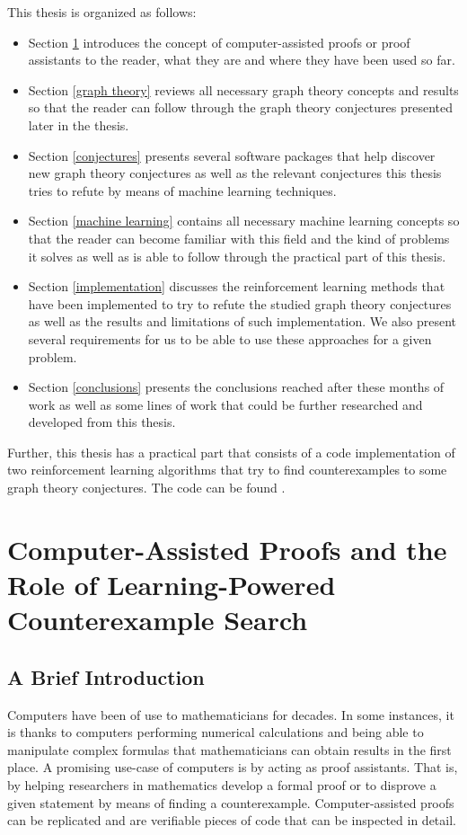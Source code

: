 \documentclass[11pt]{article}
\theoremstyle{definition}
\begin{document}
This thesis is organized as follows: 
\begin{itemize}[label=\raisebox{0.25ex}{\tiny$\bullet$}]
    \item Section \ref{computer assisted proofs} introduces the concept of computer-assisted proofs or proof assistants to the reader, what they are and where they have been used so far. 
    \item Section \ref{graph theory} reviews all necessary graph theory concepts and results so that the reader can follow through the graph theory conjectures presented later in the thesis. 
    \item Section \ref{conjectures} presents several software packages that help discover new graph theory conjectures as well as the relevant conjectures this thesis tries to refute by means of machine learning techniques. 
    \item Section \ref{machine learning} contains all necessary machine learning concepts so that the reader can become familiar with this field and the kind of problems it solves as well as is able to follow through the practical part of this thesis. 
    \item Section \ref{implementation} discusses the reinforcement learning methods that have been implemented to try to refute the studied graph theory conjectures as well as the results and limitations of such implementation. We also present several requirements for us to be able to use these approaches for a given problem.
    \item Section \ref{conclusions} presents the conclusions reached after these months of work as well as some lines of work that could be further researched and developed from this thesis.
\end{itemize}

Further, this thesis has a practical part that consists of a code implementation of two reinforcement learning algorithms that try to find counterexamples to some graph theory conjectures. The code can be found \cite{GithubLaura}. 

\newpage

\section{Computer-Assisted Proofs and the Role of Learning-Powered Counterexample Search} \label{computer assisted proofs}

\subsection{A Brief Introduction}
Computers have been of use to mathematicians for decades. In some instances, it is thanks to computers performing numerical calculations and being able to manipulate complex formulas that mathematicians can obtain results in the first place. A promising use-case of computers is by acting as proof assistants. That is, by helping researchers in mathematics develop a formal proof or to disprove a given statement by means of finding a counterexample. Computer-assisted proofs can be replicated and are verifiable pieces of code that can be inspected in detail. 
\end{document}
